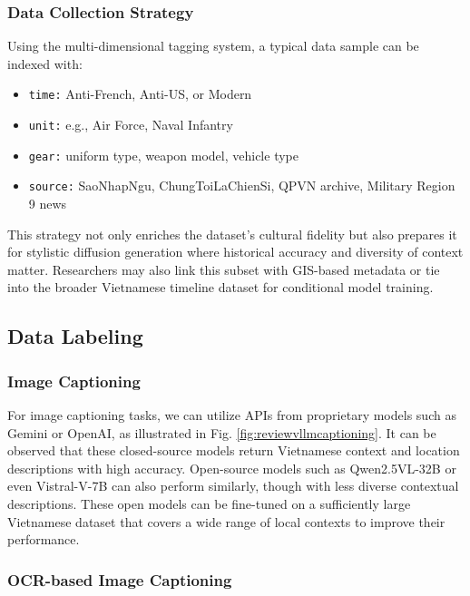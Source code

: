 \documentclass[conference]{IEEEtran}
\begin{document}
\subsubsection{Data Collection Strategy}

Using the multi-dimensional tagging system, a typical data sample can be indexed with:

\begin{itemize}
	\item \texttt{time:} Anti-French, Anti-US, or Modern
	\item \texttt{unit:} e.g., Air Force, Naval Infantry
	\item \texttt{gear:} uniform type, weapon model, vehicle type
	\item \texttt{source:} SaoNhapNgu, ChungToiLaChienSi, QPVN archive, Military Region 9 news
\end{itemize}

This strategy not only enriches the dataset’s cultural fidelity but also prepares it for stylistic diffusion generation where historical accuracy and diversity of context matter. Researchers may also link this subset with GIS-based metadata or tie into the broader Vietnamese timeline dataset for conditional model training.


\subsection{Data Labeling}

\subsubsection{Image Captioning}

For image captioning tasks, we can utilize APIs from proprietary models such as Gemini or OpenAI, as illustrated in Fig. \ref{fig:reviewvllmcaptioning}. It can be observed that these closed-source models return Vietnamese context and location descriptions with high accuracy. Open-source models such as Qwen2.5VL-32B \cite{yang2024qwen2} or even Vistral-V-7B \cite{vistral2024vietnamese} can also perform similarly, though with less diverse contextual descriptions. These open models can be fine-tuned on a sufficiently large Vietnamese dataset that covers a wide range of local contexts to improve their performance.

\subsubsection{OCR-based Image Captioning}
\end{document}
